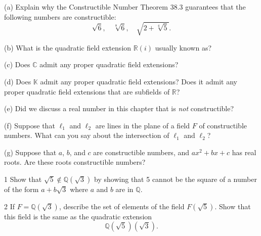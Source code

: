 \begin{problem}[Warmup]{(a)}
    Explain why the Constructible Number Theorem 38.3 guarantees that the following numbers are constructible: \[\sqrt{6}, \quad \sqrt[8]{6}, \quad \sqrt{2 + \sqrt[4]{5}}.\]
\end{problem}
\unsolved

\begin{problem}[Warmup]{(b)}
    What is the quadratic field extension $\mathbb{R}(i)$ usually known as?
\end{problem}
\unsolved

\begin{problem}[Warmup]{(c)}
    Does $\mathbb{C}$ admit any proper quadratic field extensions?
\end{problem}
\unsolved

\begin{problem}[Warmup]{(d)}
    Does $\mathbb{K}$ admit any proper quadratic field extensions? Does it admit any proper quadratic field extensions that are subfields of $\mathbb{R}$?
\end{problem}
\unsolved

\begin{problem}[Warmup]{(e)}
    Did we discuss a real number in this chapter that is \emph{not} constructible?
\end{problem}
\unsolved

\begin{problem}[Warmup]{(f)}
    Suppose that $\ell_1$ and $\ell_2$ are lines in the plane of a field $F$ of constructible numbers. What can you say about the intersection of $\ell_1$ and $\ell_2$?
\end{problem}
\unsolved

\begin{problem}[Warmup]{(g)}
    Suppose that $a$, $b$, and $c$ are constructible numbers, and $ax^2 + bx + c$ has real roots. Are these roots constructible numbers?
\end{problem}
\unsolved

\begin{problem}{1}
    Show that $\sqrt{5} \notin \mathbb{Q}(\sqrt{3})$ by showing that 5 cannot be the square
    of a number of the form $a + b\sqrt{3}$ where $a$ and $b$ are in $\mathbb{Q}$.
\end{problem}
\unsolved

\begin{problem}{2}
    If $F = \mathbb{Q}(\sqrt{3})$, describe the set of elements of the field $F(\sqrt{5})$.
    Show that this field is the same as the quadratic extension
    \[\mathbb{Q}(\sqrt{5})(\sqrt{3}).\]
\end{problem}
\unsolved

